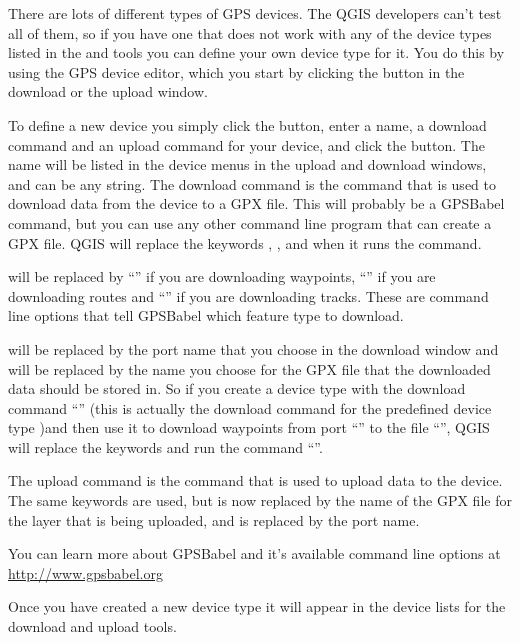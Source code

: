 There are lots of different types of GPS devices.
The QGIS developers can't test all of them, so if you have one that does not work with any of the device types listed in the  and  tools you can define your own device type for it.
You do this by using the GPS device editor, which you start by clicking the  button in the download or the upload window.

To define a new device you simply click the  button, enter a name, a download command and an upload command for your device, and click the  button.
The name will be listed in the device menus in the upload and download windows, and can be any string.
The download command is the command that is used to download data from the device to a GPX file.
This will probably be a GPSBabel command, but you can use any other command line program that can create a GPX file.
QGIS will replace the keywords , , and  when it runs the command.

 will be replaced by {}``'' if you are downloading waypoints, {}``'' if you are downloading routes and {}``'' if you are downloading tracks.
These are command line options that tell GPSBabel which feature type to download.

 will be replaced by the port name that you choose in the download window and  will be replaced by the name you choose for the GPX file that the downloaded data should be stored in.
So if you create a device type with the download command {}``'' (this is actually the download command for the predefined device type )and then use it to download waypoints from port {}``'' to the file {}``'', QGIS will replace the keywords and run the command {}``''.

The upload command is the command that is used to upload data to the device.
The same keywords are used, but  is now replaced by the name of the GPX file for the layer that is being uploaded, and  is replaced by the port name.

You can learn more about GPSBabel and it's available command line options at \url{http://www.gpsbabel.org}

Once you have created a new device type it will appear in the device lists for the download and upload tools.
